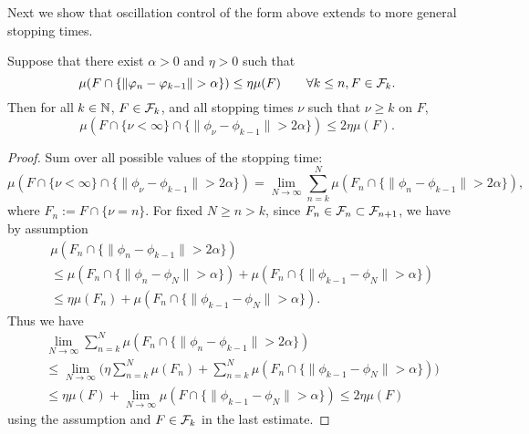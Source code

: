Next we show that oscillation control of the form above extends to more general stopping times.

\begin{lem}
  Suppose that there exist $\alpha > 0$ and $\eta > 0$ such that
  \begin{equation*}
    \mu(F \cap \{ \| \varphi_n - \varphi_{k-1} \| > \alpha \} ) \leq \eta \mu(F) \qquad \forall k \leq n, F \in \mathcal{F}_k.
  \end{equation*}
  Then for all $k \in \mathbb{N}$, $F \in \mathcal{F}_k$, and all stopping times $\nu$ such that $\nu \geq k$ on $F$,
  \begin{equation}\label{eq:jn-stoptime}
    \mu(F \cap \{\nu < \infty\} \cap \{ \| \phi_{\nu} - \phi_{k-1} \| > 2\alpha \} ) \leq 2\eta \mu(F).
  \end{equation}
\end{lem}

\begin{proof}
  Sum over all possible values of the stopping time:
  \begin{equation*}
      \mu(F \cap \{\nu < \infty\} \cap \{ \| \phi_{\nu} - \phi_{k-1} \| > 2\alpha \} ) 
      = \lim_{N \to \infty} \sum_{n = k}^{N} \mu(F_n \cap \{ \| \phi_{n} - \phi_{k-1} \| > 2\alpha \} ),
  \end{equation*}
  where $F_{n} := F \cap \{\nu = n\}$.
  For fixed $N \geq n > k$, since $F_n \in \mathcal{F}_n \subset \mathcal{F}_{n+1}$, we have by assumption
  \begin{equation*}
    \begin{aligned}
      &\mu(F_n \cap \{ \| \phi_{n} - \phi_{k-1} \| > 2\alpha \} ) \\
      &\leq \mu(F_n \cap \{ \| \phi_{n} - \phi_{N} \| > \alpha \} )
      + \mu(F_n \cap \{ \| \phi_{k-1} - \phi_{N} \| > \alpha \} ) \\
      &\leq \eta \mu(F_n) + \mu(F_n \cap \{ \| \phi_{k-1} - \phi_{N} \| > \alpha \} ).
    \end{aligned}
  \end{equation*}
  Thus we have
  \begin{equation*}
    \begin{aligned}
      &\lim_{N \to \infty} \sum_{n = k}^{N} \mu(F_n \cap \{ \| \phi_{n} - \phi_{k-1} \| > 2\alpha \} ) \\
      &\leq \lim_{N \to \infty} \Big( \eta \sum_{n=k}^N \mu(F_n) + \sum_{n=k}^N \mu(F_n \cap \{ \| \phi_{k-1} - \phi_{N} \| > \alpha \}) \Big) \\
      &\leq \eta \mu(F) + \lim_{N \to \infty} \mu(F \cap \{ \| \phi_{k-1} - \phi_{N} \| > \alpha \})  
      \leq 2\eta\mu(F)
    \end{aligned}
  \end{equation*}
  using the assumption and $F \in \mathcal{F}_k$ in the last estimate.
\end{proof}
  
